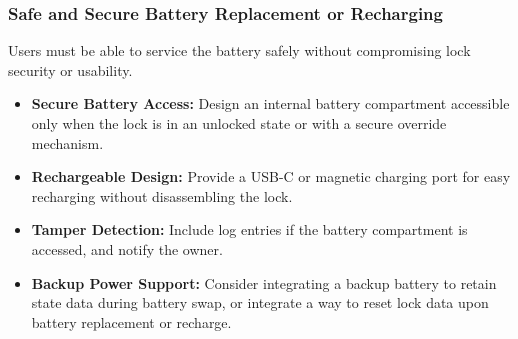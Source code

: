 \subsubsection{Safe and Secure Battery Replacement or Recharging}

Users must be able to service the battery safely without compromising lock security or usability.

\begin{itemize}
  \item \textbf{Secure Battery Access:} Design an internal battery compartment accessible only when the lock is in an unlocked state or with a secure override mechanism.
  \item \textbf{Rechargeable Design:} Provide a USB-C or magnetic charging port for easy recharging without disassembling the lock.
  \item \textbf{Tamper Detection:} Include log entries if the battery compartment is accessed, and notify the owner.
  \item \textbf{Backup Power Support:} Consider integrating a backup battery to retain state data during battery swap, or integrate a way to reset lock data upon battery replacement or recharge.
\end{itemize}
